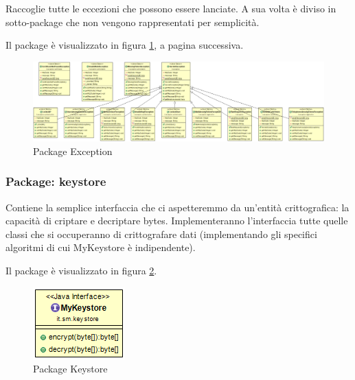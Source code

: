 Raccoglie tutte le eccezioni che possono essere lanciate. A sua volta è diviso in sotto-package che non vengono rappresentati per semplicità.

Il package è visualizzato in figura \ref{gfx:dependencies_exception}, a pagina successiva.

\tiny 
\begin{landscape}
\begin{center}
\vspace*{\fill}
\begin{figure}[!htbp]
	\centering
	\includegraphics[scale = .3]{img/dependencies_exception}
	\caption{Package Exception}
	\label{gfx:dependencies_exception}
\end{figure}
\vspace*{\fill}

\end{center}	

\end{landscape}%

\subsubsection{Package: \textbf{keystore}}

Contiene la semplice interfaccia che ci aspetteremmo da un’entità crittografica: la capacità di criptare e decriptare bytes. Implementeranno l’interfaccia tutte quelle classi che si occuperanno di crittografare dati (implementando gli specifici algoritmi di cui MyKeystore è indipendente).

Il package è visualizzato in figura \ref{gfx:dependencies_keystore}.

\begin{figure}[!htbp]
	\centering
	\includegraphics[scale = .5]{img/dependencies_keystore}
	\caption{Package Keystore}
	\label{gfx:dependencies_keystore}
\end{figure}

